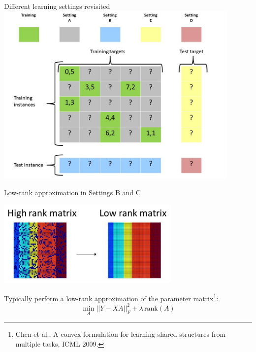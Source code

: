 \documentclass[]{beamer}
\begin{document}
\begin{frame}{Different learning settings revisited}
   \center
	\vspace{0.4cm}
   \includegraphics[width=0.9\textwidth]{Figures/pictures/Slide16} %
\end{frame}


\begin{frame}{Low-rank approximation in Settings B and C}

\begin{center}
\includegraphics[width=9cm]{pics/lowrank}
\end{center}
Typically perform a low-rank approximation of the parameter matrix\footnote{Chen et al., A convex formulation for learning shared structures from
multiple tasks, ICML 2009. }:
$$\min_A ||Y - XA ||^2_F + \lambda \, \mathrm{rank}(A)$$

\end{frame}



\end{document}
